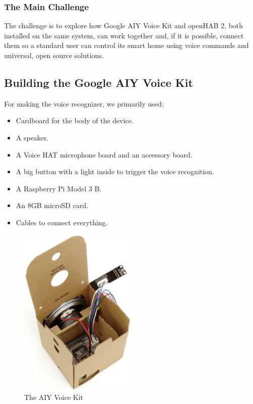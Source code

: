 \subsubsection{The Main Challenge}
The challenge is to explore how Google AIY Voice Kit and openHAB 2, both installed on the same system, can work together and,
if it is possible, connect them so a standard user can control its smart home using voice commands and universal, open source solutions.

\subsection{Building the Google AIY Voice Kit}
For making the voice recognizer, we primarily used:

\begin{itemize}
    \item Cardboard for the body of the device.
    \item A speaker.
    \item A Voice HAT microphone board and an accessory board.
    \item A big button with a light inside to trigger the voice recognition.
    \item A Raspberry Pi Model 3 B.
    \item An 8GB microSD card.
    \item Cables to connect everything.
\end{itemize}

\begin{figure}
    \centering
    \includegraphics[width=0.5\textwidth]{images/Chapter_06/aiy-voice-kit.jpeg}
    \caption{The AIY Voice Kit}
    \label{fig:aiy-voice-kit}
\end{figure}

